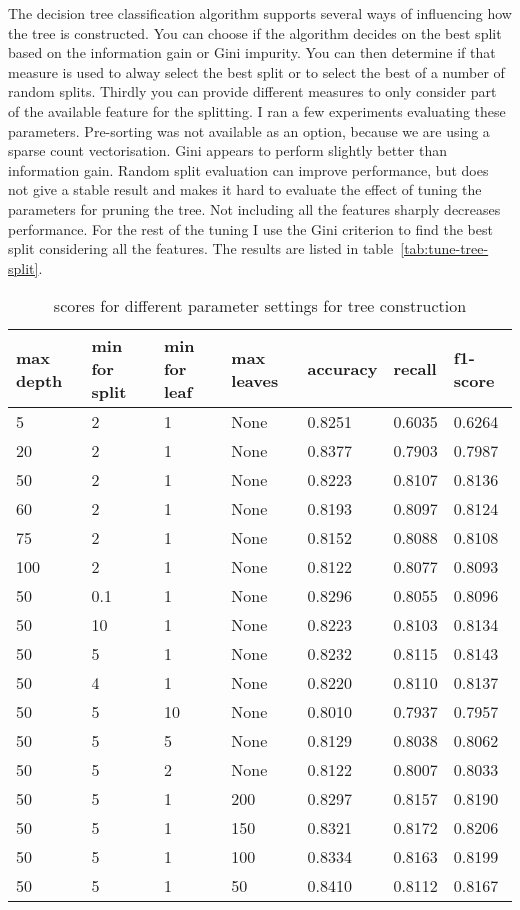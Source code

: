 \documentclass[11pt]{article}
\begin{document}
The decision tree classification algorithm supports several ways of influencing how the tree is constructed. You can choose if the algorithm decides on the best split based on the information gain or Gini impurity. You can then determine if that measure is used to alway select the best split or to select the best of a number of random splits. Thirdly you can provide different measures to only consider part of the available feature for the splitting. I ran a few experiments evaluating these parameters. Pre-sorting was not available as an option, because we are using a sparse count vectorisation. Gini appears to perform slightly better than information gain. Random split evaluation can improve performance, but does not give a stable result and makes it hard to evaluate the effect of tuning the parameters for pruning the tree. Not including all the features sharply decreases performance. For the rest of the tuning I use the Gini criterion to find the best split considering all the features. The results are listed in table~\ref{tab:tune-tree-split}.

\begin{table*}[ht]\footnotesize
\centering
\begin{tabular}{ l l l l l l l }
max depth & min for split & min for leaf & max leaves & accuracy & recall & f1-score \\
\hline
5   & 2   & 1  & None & 0.8251 & 0.6035 & 0.6264 \\
20  & 2   & 1  & None & 0.8377 & 0.7903 & 0.7987 \\
50  & 2   & 1  & None & 0.8223 & 0.8107 & 0.8136 \\
60  & 2   & 1  & None & 0.8193 & 0.8097 & 0.8124 \\
75  & 2   & 1  & None & 0.8152 & 0.8088 & 0.8108 \\
100 & 2   & 1  & None & 0.8122 & 0.8077 & 0.8093 \\
50  & 0.1 & 1  & None & 0.8296 & 0.8055 & 0.8096 \\
50  & 10  & 1  & None & 0.8223 & 0.8103 & 0.8134 \\
50  & 5   & 1  & None & 0.8232 & 0.8115 & 0.8143 \\
50  & 4   & 1  & None & 0.8220 & 0.8110 & 0.8137 \\
50  & 5   & 10 & None & 0.8010 & 0.7937 & 0.7957 \\
50  & 5   & 5  & None & 0.8129 & 0.8038 & 0.8062 \\
50  & 5   & 2  & None & 0.8122 & 0.8007 & 0.8033 \\
50  & 5   & 1  & 200  & 0.8297 & 0.8157 & 0.8190 \\
50  & 5   & 1  & 150  & 0.8321 & 0.8172 & 0.8206 \\
50  & 5   & 1  & 100  & 0.8334 & 0.8163 & 0.8199 \\
50  & 5   & 1  & 50   & 0.8410 & 0.8112 & 0.8167 \\
\end{tabular}
\caption{scores for different parameter settings for tree construction}
\label{tab:tune-tree-prune}
\end{table*}
\end{document}
